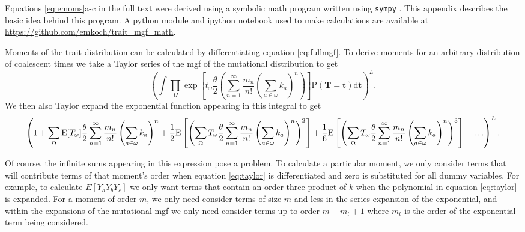 Equations \eqref{eq:emoms}a-c in the full text were derived using a symbolic
math program written using \texttt{sympy} \citep{sympy}. This appendix describes
the basic idea behind this program. A python module and ipython notebook used to
make calculations are available
at \url{https://github.com/emkoch/trait_mgf_math}. 

Moments of the trait distribution can be calculated by differentiating
equation \eqref{eq:fullmgf}. To derive moments for an arbitrary distribution of
coalescent times we take a Taylor series of the mgf of the mutational
distribution to get
\begin{equation}
  \left(\int \prod_{\Omega} \exp\left[ t_{\omega} \frac{\theta}{2} \left(
    \sum_{n=1}^{\infty} \frac{m_n}{n!} \left( \sum_{a \in \omega} k_a \right)^n
    \right) \right] \mathrm{P}(\mathbf{T} = \mathbf{t}) \mathrm{d}\mathbf{t} \right)^L.
\end{equation}
We then also Taylor expand the exponential function appearing in this integral to get
\begin{equation} \label{eq:taylor}
  \tiny
  \left( 1 + \sum_{\Omega} \mathrm{E}[T_\omega] \frac{\theta}{2}
  \sum_{n=1}^{\infty} \frac{m_n}{n!} \left( \sum_{a \in \omega} k_a \right)^n +
  \frac{1}{2} \mathrm{E} \left[ \left( \sum_{\Omega} T_\omega \frac{\theta}{2}
    \sum_{n=1}^{\infty} \frac{m_n}{n!} \left( \sum_{a \in \omega} k_a
    \right)^n\right)^2 \right] + \frac{1}{6} \mathrm{E}\left[\left(
    \sum_{\Omega} T_\omega \frac{\theta}{2} \sum_{n=1}^{\infty} \frac{m_n}{n!}
    \left( \sum_{a \in \omega} k_a \right)^n \right)^3\right] + \ldots \right)^L.
\end{equation}

Of course, the infinite sums appearing in this expression pose a problem. To
calculate a particular moment, we only consider terms that will contribute terms
of that moment's order when equation \eqref{eq:taylor} is differentiated and
zero is substituted for all dummy variables. For example, to calculate
$E[Y_aY_bY_c]$ we only want terms that contain an order three product of $k$
when the polynomial in equation \eqref{eq:taylor} is expanded. For a moment of
order $m$, we only need consider terms of size $m$ and less in the series
expansion of the exponential, and within the expansions of the mutational mgf we
only need consider terms up to order $m-m_t+1$ where $m_t$ is the order of the
exponential term being considered.

